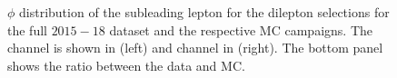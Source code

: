 \begin{figure}[]
\begin{subfigure}[b]{0.49\textwidth}
        \label{fig:datamc:uuphi2}
    \end{subfigure}
    \caption[$\phi$ distribution of the subleading lepton for the dilepton selections for the full $2015-18$ dataset and the respective MC campaigns.]{$\phi$ distribution of the subleading lepton for the dilepton selections for the full $2015-18$ dataset and the respective MC campaigns. The \ee channel is shown in (left) and \mumu channel in (right). The bottom panel shows the ratio between the data and MC.}
    \label{fig:datamc:phi2}
\end{figure}

\clearpage